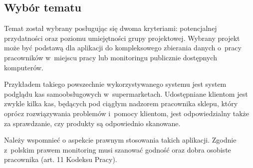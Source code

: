 \subsection {Wybór tematu}
Temat został wybrany posługując się dwoma kryteriami: potencjalnej przydatności oraz poziomu umiejętności grupy projektowej. Wybrany projekt może być podstawą dla aplikacji do kompleksowego zbierania danych o~pracy pracowników w~miejscu pracy lub monitoringu publicznie dostępnych komputerów.

Przykładem takiego powszechnie wykorzystywanego systemu jest system podglądu kas samoobsługowych w~supermarketach. Udostępniane klientom jest zwykle kilka kas, będących pod ciągłym nadzorem pracownika sklepu, który oprócz rozwiązywania problemów i~pomocy klientom, jest odpowiedzialny także za sprawdzanie, czy produkty są odpowiednio skanowane.

Należy wspomnieć o aspekcie prawnym stosowania takich aplikacji. Zgodnie z~polskim prawem monitoring musi szanować godność oraz dobra osobiste pracownika (art. 11 Kodeksu Pracy).

